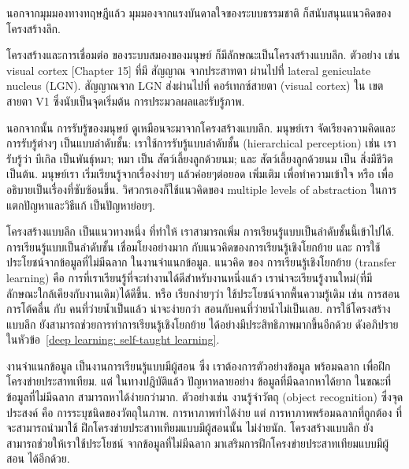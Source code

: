 นอกจากมุมมองทางทฤษฎีแล้ว มุมมองจากแรงบันดาลใจของระบบธรรมชาติ ก็สนับสนุนแนวคิดของ โครงสร้างลึก.

โครงสร้างและการเชื่อมต่อ ของระบบสมองของมนุษย์ ก็มีลักษณะเป็นโครงสร้างแบบลึก.
ตัวอย่าง เช่น visual cortex \cite{NeuroscienceOnline}[Chapter 15] ที่มี สัญญาณ จากประสาทตา ผ่านไปที่ lateral geniculate nucleus (LGN).
สัญญาณจาก LGN ส่งผ่านไปที่ คอร์เทกซ์สายตา (visual cortex) ใน เขตสายตา V1 ซึ่งนับเป็นจุดเริ่มต้น การประมวลผลและรับรู้ภาพ.

นอกจากนั้น การรับรู้ของมนุษย์ ดูเหมือนจะมาจากโครงสร้างแบบลึก.
มนุษย์เรา จัดเรียงความคิดและการรับรู้ต่างๆ เป็นแบบลำดับชั้น:
เราใช้การรับรู้แบบลำดับชั้น (hierarchical perception) เช่น เรารับรู้ว่า บีเกิล เป็นพันธ์ุหมา; หมา เป็น สัตว์เลี้ยงลูกด้วยนม; และ สัตว์เลี้ยงลูกด้วยนม เป็น สิ่งมีชีวิต เป็นต้น.
มนุษย์เรา เริ่มเรียนรู้จากเรื่องง่ายๆ แล้วค่อยๆต่อยอด เพิ่มเติม เพื่อทำความเข้าใจ หรือ เพื่อ อธิบายเป็นเรื่องที่ซับซ้อนขึ้น.
วิศวกรเองก็ใช้แนวคิดของ multiple levels of abstraction ในการแตกปัญหาและวิธีแก้ เป็นปัญหาย่อยๆ.

โครงสร้างแบบลึก เป็นแนวทางหนึ่ง ที่ทำให้ เราสามารถเพิ่ม การเรียนรู้แบบเป็นลำดับชั้นนี้เข้าไปได้.
การเรียนรู้แบบเป็นลำดับชั้น เชื่อมโยงอย่างมาก กับแนวคิดของการเรียนรู้เชิงโยกย้าย และ การใช้ประโยชน์จากข้อมูลที่ไม่มีฉลาก ในงานจำแนกข้อมูล.
แนวคิด ของ การเรียนรู้เชิงโยกย้าย (transfer learning) คือ การที่เราเรียนรู้ที่จะทำงานได้ดีสำหรับงานหนึ่งแล้ว เราน่าจะเรียนรู้งานใหม่(ที่มีลักษณะใกล้เคียงกับงานเดิม)ได้ดีขึ้น.
หรือ เรียกง่ายๆว่า ใช้ประโยชน์จากพื้นความรู้เดิม เช่น การสอนการโต้คลื่น กับ คนที่ว่ายน้ำเป็นแล้ว น่าจะง่ายกว่า สอนกับคนที่ว่ายน้ำไม่เป็นเลย.
%
การใช้โครงสร้างแบบลึก ยังสามารถช่วยการทำการเรียนรู้เชิงโยกย้าย ได้อย่างมีประสิทธิภาพมากขึ้นอีกด้วย ดังอภิปรายในหัวข้อ~\ref{deep learning: self-taught learning}.

งานจำแนกข้อมูล เป็นงานการเรียนรู้แบบมีผู้สอน ซึ่ง เราต้องการตัวอย่างข้อมูล พร้อมฉลาก เพื่อฝึกโครงข่ายประสาทเทียม.
แต่ ในทางปฎิบัติแล้ว ปัญหาหลายอย่าง ข้อมูลที่มีฉลากหาได้ยาก ในขณะที่ ข้อมูลที่ไม่มีฉลาก สามารถหาได้ง่ายกว่ามาก.
ตัวอย่างเช่น งานรู้จำวัตถุ (object recognition) ซึ่งจุดประสงค์ คือ การระบุชนิดของวัตถุในภาพ.
การหาภาพทำได้ง่าย 
แต่ การหาภาพพร้อมฉลากที่ถูกต้อง ที่จะสามารถนำมาใช้ ฝึกโครงข่ายประสาทเทียมแบบมีผู้สอนนั้น ไม่ง่ายนัก.
โครงสร้างแบบลึก ยังสามารถช่วยให้เราใช้ประโยชน์ จากข้อมูลที่ไม่มีฉลาก มาเสริมการฝึกโครงข่ายประสาทเทียมแบบมีผู้สอน ได้อีกด้วย.


